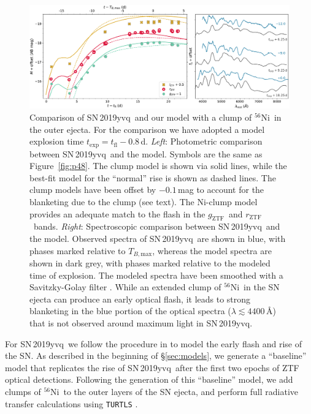 \documentclass[twocolumn]{aastex63}
\newcommand{\rztf}{$r_\mathrm{ZTF}$}
\newcommand{\gztf}{$g_\mathrm{ZTF}$}
\newcommand{\tbmax}{$T_{B,\mathrm{max}}$}
\newcommand{\radni}{$^{56}$Ni}
\newcommand{\sn}{SN\,2019yvq}
\begin{document}
\begin{figure}
    \centering
    \includegraphics[width=\textwidth]{./figures/clump_model.pdf}
    \caption{Comparison of \sn\ and our model with a 
    clump of \radni\ in the outer ejecta. For the comparison we have adopted a
    model explosion time $t_\mathrm{exp} = t_\mathrm{fl} - 0.8$\,d.
    \textit{Left}: Photometric comparison between \sn\ and the model. Symbols
    are the same as Figure~\ref{fig:p48}. The clump model is shown via solid
    lines, while the best-fit model for the ``normal'' rise is shown as dashed
    lines. The clump models have been offset by $-0.1$\,mag to account for the
    blanketing due to the clump (see text). The Ni-clump model provides an
    adequate match to the flash in the \gztf\ and \rztf\ bands.
    \textit{Right}: Spectroscopic comparison between \sn\ and the model.
    Observed spectra of \sn\ are shown in blue, with phases marked relative to
    \tbmax, whereas the model spectra are shown in dark grey, with phases
    marked relative to the modeled time of explosion. The modeled spectra have
    been smoothed with a Savitzky-Golay filter \citep{Savitzky64}. While an
    extended clump of \radni\ in the SN ejecta can produce an early optical
    flash, it leads to strong blanketing in the blue portion of the optical
    spectra ($\lambda \lesssim 4400$\,\AA) that is not observed around maximum
    light in \sn. }
    \label{fig:Ni_bullet}
\end{figure}

For \sn\ we follow the procedure in \citet{Magee20a} to model the early flash
and rise of the SN. As described in the beginning of \S\ref{sec:models}, we
generate a ``baseline'' model that replicates the rise of \sn\ after the first
two epochs of ZTF optical detections. Following the generation of this
``baseline'' model, we add clumps of \radni\ to the outer layers of the SN
ejecta, and perform full radiative transfer calculations using \texttt{TURTLS}
\citep{Magee18}. 
\end{document}
